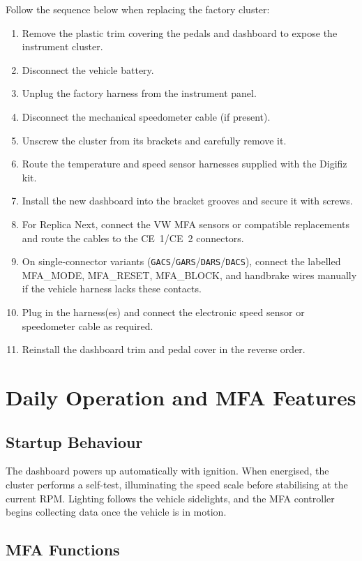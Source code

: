 Follow the sequence below when replacing the factory cluster:
\begin{enumerate}
    \item Remove the plastic trim covering the pedals and dashboard to expose the instrument cluster.
    \item Disconnect the vehicle battery.
    \item Unplug the factory harness from the instrument panel.
    \item Disconnect the mechanical speedometer cable (if present).
    \item Unscrew the cluster from its brackets and carefully remove it.
    \item Route the temperature and speed sensor harnesses supplied with the Digifiz kit.
    \item Install the new dashboard into the bracket grooves and secure it with screws.
    \item For Replica Next, connect the VW MFA sensors or compatible replacements and route the cables to the CE~1/CE~2 connectors.
    \item On single-connector variants (\texttt{GACS}/\texttt{GARS}/\texttt{DARS}/\texttt{DACS}), connect the labelled MFA\_MODE, MFA\_RESET, MFA\_BLOCK, and handbrake wires manually if the vehicle harness lacks these contacts.
    \item Plug in the harness(es) and connect the electronic speed sensor or speedometer cable as required.
    \item Reinstall the dashboard trim and pedal cover in the reverse order.
\end{enumerate}

\section{Daily Operation and MFA Features}

\subsection{Startup Behaviour}

The dashboard powers up automatically with ignition.
When energised, the cluster performs a self-test, illuminating the speed scale before stabilising at the current RPM.
Lighting follows the vehicle sidelights, and the MFA controller begins collecting data once the vehicle is in motion.

\subsection{MFA Functions}

